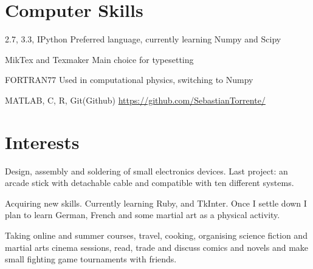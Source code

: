 \documentclass[11pt,a4paper,roman]{moderncv}
\begin{document}
\section{Computer Skills}

	{2.7, 3.3, IPython}
	{Preferred language, currently learning Numpy and Scipy}

\cvitemwithcomment{\LaTeX}
	{MikTex and Texmaker}
	{Main choice for typesetting}

	{FORTRAN77}
	{Used in computational physics, switching to Numpy}


	{MATLAB, C, R, Git(Github)}
	{\href{https://github.com/SebastianTorrente/}
	{https://github.com/SebastianTorrente/}}




\section{Interests}

	{Design, assembly and soldering of small electronics devices. Last project: an arcade stick with detachable cable and compatible with ten different systems.}

	{Acquiring new skills. Currently learning Ruby, and TkInter.
	Once I settle down I plan to learn German, French and some martial art as a 
	physical activity.}


	{Taking online and summer courses, travel, cooking, organising science fiction and martial arts cinema sessions, read, trade and discuss comics and novels and make small fighting game tournaments with friends.}

\end{document}
